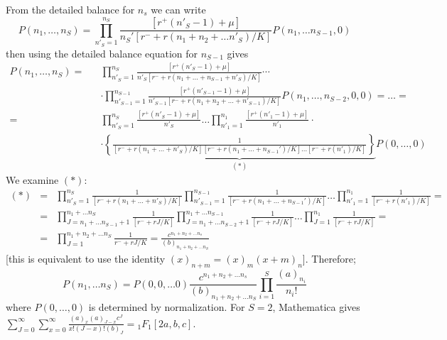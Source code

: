 \documentclass[%
 amsmath,amssymb,
 reprint,%
]{revtex4-2}
\begin{document}
\begin{widetext}
From the detailed balance for $n_s$ we can write
\begin{equation}
    P(n_1,\dots,n_S)=\prod_{n'_S=1}^{n_S}\frac{[r^+(n'_S-1)+\mu]}{n_S'[r^- + r(n_1+n_2+\dots n'_S)/K]}P(n_1,\dots n_{S-1},0)
\end{equation}
then using the detailed balance equation for $n_{S-1}$ gives
\begin{eqnarray}
       P(n_1,\dots,n_S) =&&\prod_{n'_S=1}^{n_S}\frac{[r^+(n'_S-1)+\mu]}{n'_S[r^- + r(n_1+\dots+n_{S-1}+ n'_S)/K]} \cdots \\ \nonumber
      && \cdot \prod_{n'_{S-1}=1}^{n_{S-1}}\frac{[r^+(n'_{S-1}-1)+\mu]}{n'_{S-1}[r^- + r(n_1+n_2+\dots+n'_{S-1})/K]}P(n_1,\dots, n_{S-2}, 0,0) = \dots =  \\ \nonumber 
        = && \prod_{n'_S=1}^{n_S}\frac{[r^+(n'_S-1)+\mu]}{n'_S}\dots \prod_{n'_1=1}^{n_1}\frac{[r^+(n'_1-1)+\mu]}{n'_1} \cdot \\ \nonumber && \cdot \underbrace{\left\{\frac{1}{[r^- + r(n_1+\dots+ n'_S)/K][r^- + r(n_1+\dots+n_{S-1}')/K]\dots [r^- + r(n'_1)/K]}\right\}}_{(*)} P(0,\dots, 0)
\end{eqnarray}
We examine $(*)$:
\begin{eqnarray}
(*)&=&  \prod_{n'_S=1}^{n_S} \frac{1}{[r^- + r(n_1+\dots+ n'_S)/K]}  \prod_{n'_{S-1}=1}^{n_{S-1}}\frac{1}{[r^- + r(n_1+\dots+n_{S-1}')/K]}\dots \prod_{n'_{1}=1}^{n_{1}} \frac{1}{ [r^- + r(n'_1)/K]} = \\ \nonumber 
  &=&  \prod_{J=n_1+\dots n_{S-1}+1 }^{n_1+\dots n_{S} } \frac{1}{[r^- + rJ/K]}  \prod_{J=n_1+ \dots n_{S-2}+1}^{n_1+ \dots n_{S-1}}\frac{1}{[r^- + rJ/K]}\dots \prod_{J=1}^{n_{1}} \frac{1}{ [r^- + rJ/K]} = \\ \nonumber
  &=& \prod_{J=1}^{n_1+n_2+\dots n_S}\frac{1}{r^-+rJ/K}=\frac{c^{n_1+n_2+\dots n_s}}{(b)_{n_1+n_2+\dots n_S}}
\end{eqnarray}
[this is equivalent to use the identity $(x)_{n+m}=(x)_{m}(x+m)_{n}$].  Therefore; 
\begin{equation}
    P(n_1,\dots n_S)=P(0,0,\dots 0)\frac{c^{n_1+n_2+\dots n_s}}{(b)_{n_1+n_2+\dots n_S}}\prod_{i=1}^{S}\frac{(a)_{n_i}}{n_i!}
\end{equation}
where $P(0,\dots, 0)$ is determined by normalization.
For $S=2$, Mathematica gives $\sum_{J=0}^{\infty}\sum_{x=0}^{\infty}\frac{(a)_{x}(a)_{J-x}c^{J}}{x!(J-x)!(b)_{J}}={_1F_1\left[2a,b,c\right]}$.


\end{widetext}
\end{document}
